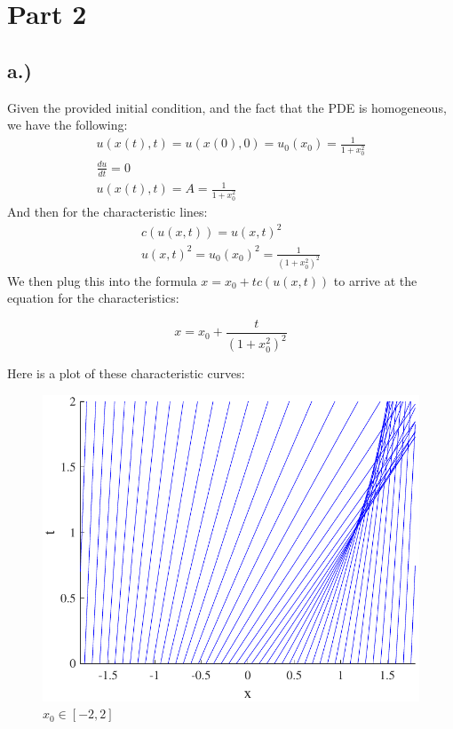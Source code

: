 \documentclass{article}
\begin{document}
\section*{Part 2}
\subsection*{a.)}
Given the provided initial condition, and the fact that the PDE is homogeneous, we have the following:
\begin{equation}
\begin{aligned}
u(x(t), t) = u(x(0), 0) = u_0(x_0) = \frac{1}{1+x_0^2}\\
\frac{du}{dt} = 0\\
u(x(t), t) = A = \frac{1}{1+x_0^2}
\end{aligned}
\end{equation}
And then for the characteristic lines:
\begin{equation}
\begin{aligned}
c(u(x,t)) = u(x,t)^2\\
u(x,t)^2 = u_0(x_0)^2 = \frac{1}{(1+x_0^2)^2}
\end{aligned}
\end{equation}
We then plug this into the formula $x = x_0 + tc(u(x,t))$ to arrive at the equation for the characteristics:
\begin{tcolorbox}[minipage,colback=white,arc=0pt,outer arc=0pt]
\begin{equation}
x = x_0 + \frac{t}{(1+x_0^2)^2}
\end{equation}
\end{tcolorbox}
Here is a plot of these characteristic curves:
\begin{figure}[H]
  \centering
    \includegraphics[width=\textwidth]{hw_13_plot8.pdf}
    \caption{$x_0 \in [-2, 2]$}
\end{figure}
\end{document}
